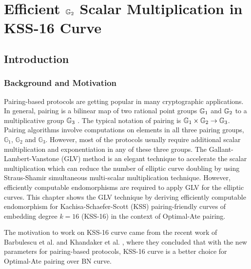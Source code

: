 \chapter{Efficient \texorpdfstring{${\mathbb{G}}_{2}$}{G2} Scalar Multiplication in KSS-16 Curve} 
\label{ch:candar2018}


\section{Introduction}
\subsection{Background and Motivation}
Pairing-based protocols are getting popular in many cryptographic applications. 
In general, pairing is a bilinear map of two rational point groups ${\mathbb{G}}_{1}$ and ${\mathbb{G}}_{2}$ to a multiplicative group ${\mathbb{G}}_{3}$ \cite{Silverman}.
The typical notation of pairing is ${\mathbb{G}}_{1} \times {\mathbb{G}}_{2} \rightarrow {\mathbb{G}}_{3}$.
Pairing algorithms involve computations on elements in all three pairing groups, $\mathbb{G}_1$, $\mathbb{G}_2$ and $\mathbb{G}_3$.
However, most of the protocols usually require additional scalar multiplication and exponentiation in any of these three groups. 
The Gallant-Lambert-Vanstone (GLV) method is an elegant technique to accelerate the scalar multiplication which can reduce the number of elliptic curve doubling by using Straus-Shamir simultaneous multi-scalar multiplication technique.
However, efficiently computable endomorphisms are required to apply GLV for the elliptic curves. 
This chapter shows the GLV technique by deriving efficiently computable endomorphism for Kachisa-Schaefer-Scott (KSS)  \cite{EPRINT:KacSchSco07} pairing-friendly curves of embedding degree $k=16$ (KSS-16) in the context of Optimal-Ate pairing.


The motivation to work on KSS-16 curve came from the recent work of Barbulescu et al. \cite{EPRINT:BarDuq17} and Khandaker et al. \cite{INDOCRYPT:KNGDNK17}, where they concluded that with the new parameters for pairing-based protocols, KSS-16 curve is a better choice for Optimal-Ate pairing over BN curve.

